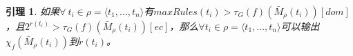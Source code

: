 \documentclass{ctexart}
\newtheorem{lemma}{引理}
\newtheorem{proof}{证明}
\begin{document}
\begin{lemma} 
\label{lemma:core-lemma}
如果$\forall\ t_i \in \rho = \langle t_1, ..., t_n \rangle$有$maxRules(t_i) > \tau_G(f)(\bar{M}_\rho(t_i))[dom]$，且$2^{r(t_i)} > \tau_G(f)(\bar{M}_\rho(t_i))[ec]$，那么$\forall t_i \in \rho = \langle t_1, ..., t_n \rangle$可以输出$\chi_f(\bar{M}_\rho(t_i))$到$r(t_i)$。
\end{lemma}
%
%
%
%
%
%
%
%
%
\end{document}
